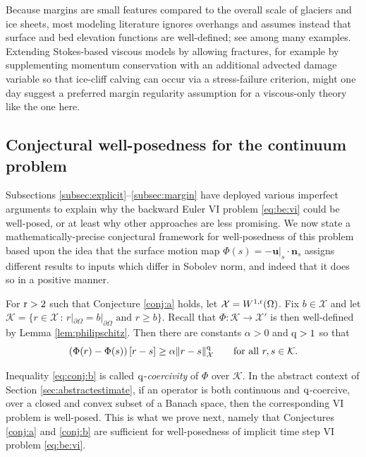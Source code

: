 \documentclass[hidelinks,onefignum,onetabnum,final]{siamart220329}  %
\newcommand{\bn}{\mathbf{n}}
\newcommand{\bu}{\mathbf{u}}
\newcommand{\cK}{\mathcal{K}}
\newcommand{\cX}{\mathcal{X}}
\newcommand{\qq}{{\text{\textnormal{q}}}}
\newcommand{\rr}{{\text{\textnormal{r}}}}
\begin{document}
Because margins are small features compared to the overall scale of glaciers and ice sheets, most modeling literature ignores overhangs and assumes instead that surface and bed elevation functions are well-defined; see \cite{IsaacStadlerGhattas2015,Jouvetetal2008,LofgrenAhlkronaHelanow2022,WirbelJarosch2020} among many examples.  Extending Stokes-based viscous models by allowing fractures, for example by supplementing momentum conservation with an additional advected damage variable \cite{PralongFunk2005} so that ice-cliff calving can occur via a stress-failure criterion, might one day suggest a preferred margin regularity assumption for a viscous-only theory like the one here.

\subsection{Conjectural well-posedness for the continuum problem} \label{subsec:conjecture} Subsections \ref{subsec:explicit}--\ref{subsec:margin} have deployed various imperfect arguments to explain why the backward Euler VI problem \eqref{eq:be:vi} could be well-posed, or at least why other approaches are less promising.  We now state a mathematically-precise conjectural framework for well-posedness of this problem based upon the idea that the surface motion map $\Phi(s) = -\bu|_s\cdot \bn_s$ assigns different results to inputs which differ in Sobolev norm, and indeed that it does so in a positive manner.

\begin{conjecture} \label{conj:b}  For $\rr>2$ such that Conjecture \ref{conj:a} holds, let $\cX = W^{1,\rr}(\Omega)$.  Fix $b\in\cX$ and let $\cK=\{r\in\cX\,:\,r|_{\partial\Omega}=b|_{\partial\Omega} \text{ and } r\ge b\}$.  Recall that $\Phi:\cK\to\cX'$ is then well-defined by Lemma \ref{lem:philipschitz}.  Then there are constants $\alpha>0$ and $\qq>1$ so that
\begin{equation}
\left(\Phi(r) - \Phi(s)\right)[r-s] \ge \alpha \|r-s\|_{\cX}^\qq \qquad \text{for all } r,s\in\cK. \label{eq:conj:b}
\end{equation}
\end{conjecture}

Inequality \eqref{eq:conj:b} is called $\qq$-\emph{coercivity} of $\Phi$ over $\cK$.  In the abstract context of Section \ref{sec:abstractestimate}, if an operator is both continuous and $\qq$-coercive, over a closed and convex subset of a Banach space, then the corresponding VI problem is well-posed.  This is what we prove next, namely that Conjectures \ref{conj:a} and \ref{conj:b} are sufficient for well-posedness of implicit time step VI problem \eqref{eq:be:vi}.
\end{document}

